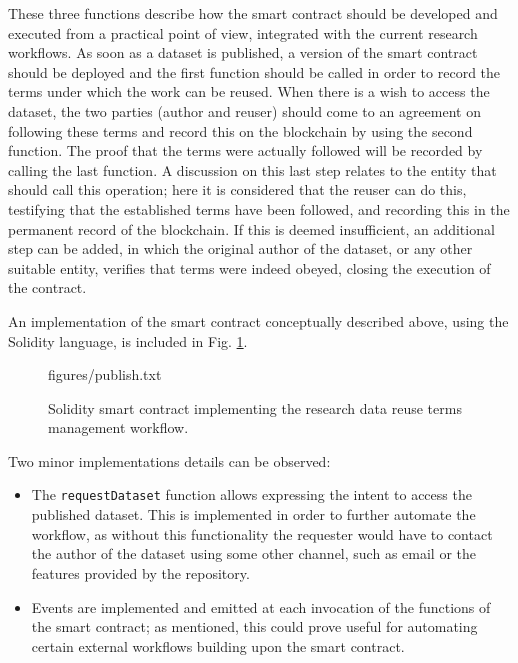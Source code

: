 These three functions describe how the smart contract should be developed and executed from a practical point of view, integrated with the current research workflows. As soon as a dataset is published, a version of the smart contract should be deployed and the first function should be called in order to record the terms under which the work can be reused. When there is a wish to access the dataset, the two parties (author and reuser) should come to an agreement on following these terms and record this on the blockchain by using the second function. The proof that the terms were actually followed will be recorded by calling the last function. A discussion on this last step relates to the entity that should call this operation; here it is considered that the reuser can do this, testifying that the established terms have been followed, and recording this in the permanent record of the blockchain. If this is deemed insufficient, an additional step can be added, in which the original author of the dataset, or any other suitable entity, verifies that terms were indeed obeyed, closing the execution of the contract.

An implementation of the smart contract conceptually described above, using the Solidity language, is included in Fig. \ref{lst:solidity}.

\begin{figure}

  {figures/publish.txt}
  \caption{Solidity smart contract implementing the research data reuse terms management workflow.}
  \label{lst:solidity}
\end{figure}

Two minor implementations details can be observed:
\begin{itemize}
\item The \texttt{requestDataset} function allows expressing the intent to access the published dataset. This
is implemented in order to further automate the workflow, as without this functionality the requester would have to contact the author of the dataset using some other channel, such as email or
the features provided by the repository.
\item Events are implemented and emitted at each invocation of the functions of the smart contract; as mentioned, this could
prove useful for automating certain external workflows building upon the smart contract.
\end{itemize}

